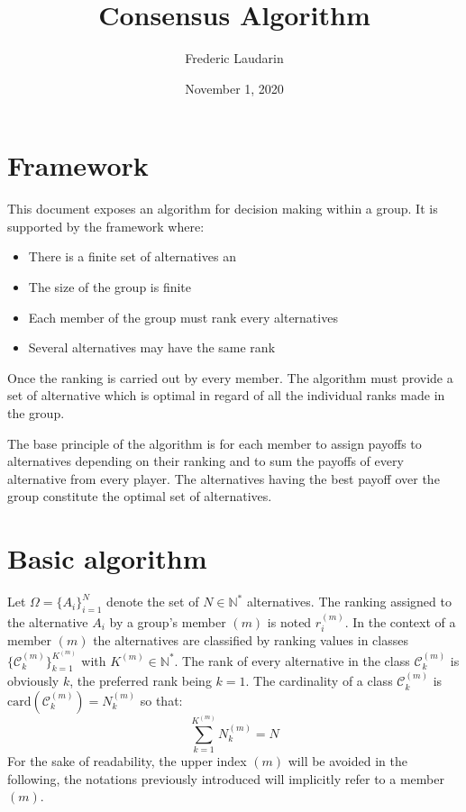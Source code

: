 \documentclass[12pt,a4paper]{article}
\begin{document}
\title{Consensus Algorithm}
\author{Frederic Laudarin}
\date{November 1, 2020}
\maketitle

\section{Framework}

This document exposes an algorithm for decision making within a group. It is supported by the framework where:
\begin{itemize}
\item There is a finite set of alternatives an
\item The size of the group is finite
\item Each member of the group must rank every alternatives
\item Several alternatives may have the same rank
\end{itemize}
Once the ranking is carried out by every member. The algorithm must provide a set of alternative which is optimal in regard of all the individual ranks made in the group.

The base principle of the algorithm is for each member to assign payoffs to alternatives depending on their ranking and to sum the payoffs of every alternative from every player. The alternatives having the best payoff over the group constitute the optimal set of alternatives.

\section{Basic algorithm}

Let $\Omega=\{A_i\}_{i=1}^N$ denote the set of $N\in\mathbb{N}^*$ alternatives. The ranking assigned to the alternative $A_i$ by a group's member $(m)$ is noted $r_i^{(m)}$. In the context of a member $(m)$ the alternatives are classified by ranking values in classes $\{\mathcal{C}_k^{(m)}\}_{k=1}^{K^{(m)}}$ with $K^{(m)}\in\mathbb{N}^*$. The rank of every alternative in the class $\mathcal{C}_k^{(m)}$ is obviously $k$, the preferred rank being $k=1$. The cardinality of a class $\mathcal{C}_k^{(m)}$ is $\mathrm{card}(\mathcal{C}_k^{(m)}) = N_k^{(m)}$ so that:
\begin{equation}
\sum_{k=1}^{K^{(m)}}{N_k^{(m)}} = N
\end{equation}
For the sake of readability, the upper index $(m)$ will be avoided in the following, the notations previously introduced will implicitly refer to a member $(m)$.
\end{document}
